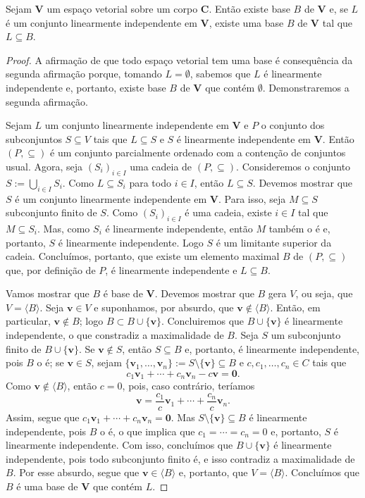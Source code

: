 \begin{teo}
	Sejam $\bm V$ um espaço vetorial sobre um corpo $\bm C$. Então existe base $B$ de $\bm V$ e, se $L$  é um conjunto linearmente independente em $\bm V$, existe uma base $B$ de $\bm V$ tal que $L \subseteq B$.
\end{teo}
\begin{proof}
	A afirmação de que todo espaço vetorial tem uma base é consequência da segunda afirmação porque, tomando $L=\emptyset$, sabemos que $L$ é linearmente independente e, portanto, existe base $B$ de $\bm V$ que contém $\emptyset$. Demonstraremos a segunda afirmação.

	Sejam $L$ um conjunto linearmente independente em $\bm V$ e $P$ o conjunto dos subconjuntos $S \subseteq V$ tais que $L \subseteq S$ e $S$ é linearmente independente em $\bm V$. Então $(P,\subseteq)$ é um conjunto parcialmente ordenado com a contenção de conjuntos usual. Agora, seja $(S_i)_{i \in I}$ uma cadeia de $(P,\subseteq)$. Consideremos o conjunto $S := \bigcup_{i \in I} S_i$. Como $L \subseteq S_i$ para todo $i \in I$, então $L \subseteq S$. Devemos mostrar que $S$ é um conjunto linearmente independente em $\bm V$. Para isso, seja $M \subseteq S$ subconjunto finito de $S$. Como $(S_i)_{i \in I}$ é uma cadeia, existe $i \in I$ tal que $M \subseteq S_i$. Mas, como $S_i$ é linearmente independente, então $M$ também o é e, portanto, $S$ é linearmente independente. Logo $S$ é um limitante superior da cadeia. Concluímos, portanto, que existe um elemento maximal $B$ de $(P,\subseteq)$ que, por definição de $P$, é linearmente independente e $L \subseteq B$.

	Vamos mostrar que $B$ é base de $\bm V$. Devemos mostrar que $B$ gera $V$, ou seja, que $V=\langle B \rangle$.
Seja $\bm v \in V$ e suponhamos, por absurdo, que $\bm v \notin \langle B \rangle$. Então, em particular, $\bm v \notin B$; logo $B \subset B \cup \{\bm v\}$. Concluiremos que $B \cup \{\bm v\}$ é linearmente independente, o que constradiz a maximalidade de $B$. Seja $S$ um subconjunto finito de $B \cup \{\bm v\}$. Se $\bm v \notin S$, então $S \subseteq B$ e, portanto, é linearmente independente, pois $B$ o é; se $\bm v \in S$, sejam $\{\bm v_1,\ldots,\bm v_n\} := S \setminus \{\bm v\} \subseteq B$ e $c,c_1,\ldots,c_n \in C$ tais que
	\begin{equation*}
	c_1\bm v_1 + \cdots + c_n\bm v_n -c\bm v=\bm 0.
	\end{equation*}
Como $\bm v \notin \langle B \rangle$, então $c=0$, pois, caso contrário, teríamos
	\begin{equation*}
	\bm v=\frac{c_1}{c}\bm v_1 + \cdots + \frac{c_n}{c}\bm v_n.
	\end{equation*}
Assim, segue que $c_1\bm v_1 + \cdots + c_n\bm v_n=\bm 0$. Mas $S \setminus \{\bm v\} \subseteq B$ é linearmente independente, pois $B$ o é, o que implica que $c_1=\cdots=c_n=0$ e, portanto, $S$ é linearmente independente. Com isso, concluímos que $B \cup \{\bm v\}$ é linearmente independente, pois todo subconjunto finito é, e isso contradiz a maximalidade de $B$. Por esse absurdo, segue que $\bm v \in \langle B \rangle$ e, portanto, que $V=\langle B \rangle$. Concluímos que $B$ é uma base de $\bm V$ que contém $L$.
\end{proof}

